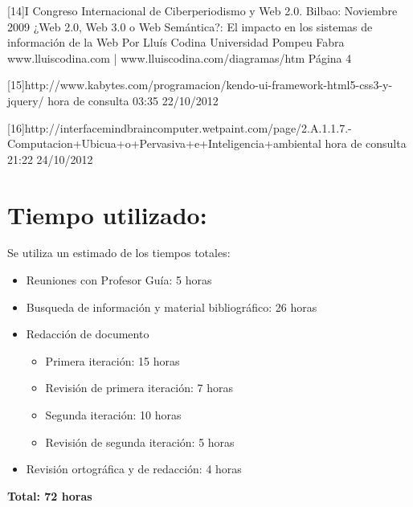 [14]I Congreso Internacional de Ciberperiodismo y Web 2.0. Bilbao: Noviembre 2009
    ¿Web 2.0, Web 3.0 o Web Semántica?: El impacto en los sistemas de
    información de la Web
    Por Lluís Codina
    Universidad Pompeu Fabra
    www.lluiscodina.com | www.lluiscodina.com/diagramas/htm
    Página 4
    
[15]http://www.kabytes.com/programacion/kendo-ui-framework-html5-css3-y-jquery/ hora de consulta 03:35 22/10/2012

[16]http://interfacemindbraincomputer.wetpaint.com/page/2.A.1.1.7.-Computacion+Ubicua+o+Pervasiva+e+Inteligencia+ambiental hora de consulta 
21:22 24/10/2012

\section{Tiempo utilizado:}

Se utiliza un estimado de los tiempos totales:

\begin{itemize}
 \item Reuniones con Profesor Guía: 5 horas
 \item Busqueda de información y material bibliográfico: 26 horas
 \item Redacción de documento
 \begin{itemize}
  \item Primera iteración: 15 horas
  \item Revisión de primera iteración: 7 horas
  \item Segunda iteración: 10 horas
  \item Revisión de segunda iteración: 5 horas
 \end{itemize}
 \item Revisión ortográfica y de redacción: 4 horas
\end{itemize}
\textbf{Total: 72 horas }



